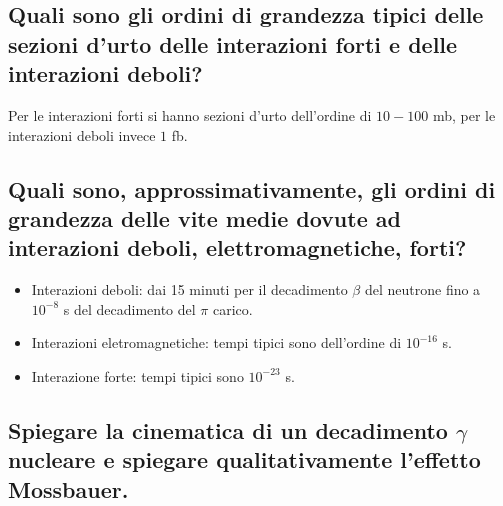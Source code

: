 \subsection[$\ $ Ordini di grandezza di sezioni d'urto forti o deboli]{ Quali sono gli ordini di grandezza tipici delle sezioni d’urto delle interazioni forti e delle interazioni deboli?}
Per le interazioni forti si hanno sezioni d'urto dell'ordine di $10 - 100$ mb, per le interazioni deboli invece $1$ fb.

\subsection[$\ $ Vite medie per interazioni forti, elettromagnetiche, deboli]{Quali sono, approssimativamente, gli ordini di grandezza delle vite medie dovute ad interazioni deboli, elettromagnetiche, forti?}
\begin{itemize}
	\item Interazioni deboli: dai 15 minuti per il decadimento $\beta$ del neutrone fino a $10^{-8}$ s del decadimento del  $\pi$ carico.
	\item Interazioni eletromagnetiche: tempi tipici sono dell'ordine di $10^{-16}$ s.
	\item Interazione forte: tempi tipici sono $10^{-23}$ s.
\end{itemize}

\subsection[$\ $ Cinematica dell'effetto Mossbauer]{Spiegare la cinematica di un decadimento $\gamma$ nucleare e spiegare qualitativamente l'effetto Mossbauer. }
